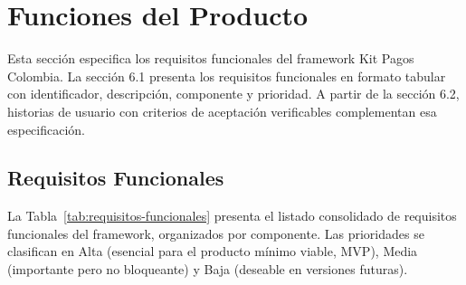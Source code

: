 \section{Funciones del Producto}

Esta sección especifica los requisitos funcionales del framework Kit Pagos Colombia. La sección 6.1 presenta los requisitos funcionales en formato tabular con identificador, descripción, componente y prioridad. A partir de la sección 6.2, historias de usuario con criterios de aceptación verificables complementan esa especificación.

\subsection{Requisitos Funcionales}

La Tabla~\ref{tab:requisitos-funcionales} presenta el listado consolidado de requisitos funcionales del framework, organizados por componente. Las prioridades se clasifican en Alta (esencial para el producto mínimo viable, MVP), Media (importante pero no bloqueante) y Baja (deseable en versiones futuras).


